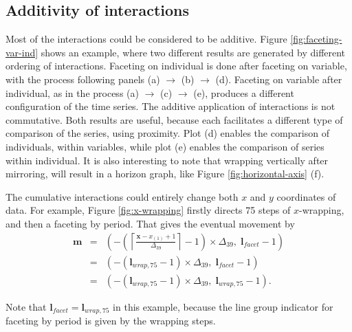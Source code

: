 \documentclass[12pt]{article}
\begin{document}
\subsection{Additivity of interactions\label{interaction-addition}}

Most of the interactions could be considered to be additive.
Figure \ref{fig:faceting-var-ind} shows an example, where two
different results are generated by different ordering of interactions.
Faceting on individual is done after faceting on variable, with the
process following panels (a) $\rightarrow$ (b) $\rightarrow$ (d).
Faceting on variable after individual, as in the process (a)
$\rightarrow$ (c) $\rightarrow$ (e), produces a different
configuration of the time series. The additive application of
interactions is not commutative. Both results are useful, because
each facilitates a different type of comparison of the series,
using proximity. Plot (d) enables the comparison of individuals,
within variables, while plot (e) enables the comparison of series
within individual. It is also interesting to
note that wrapping vertically after mirroring, will result in
a horizon graph, like Figure \ref{fig:horizontal-axis} (f).

The cumulative interactions could
entirely change both $x$ and $y$ coordinates of data.
For example, Figure \ref{fig:x-wrapping} firstly directs
75 steps of $x$-wrapping, and then a faceting by
period. That gives the eventual movement by
\begin{eqnarray*}
\mathbf{m} & = & (-\left(\left\lceil \frac{\mathbf{x}-x_{(1)}+1}{\Delta_{39}}\right\rceil -1\right)\times\Delta_{39}, \; \mathbf{l}{}_{facet}-1) \\
& = & (-(\mathbf{l}{}_{wrap,75} -1)\times\Delta_{39}, \; \mathbf{l}{}_{facet}-1) \\
& = & (-(\mathbf{l}{}_{wrap,75} -1)\times\Delta_{39}, \; \mathbf{l}{}_{wrap,75}-1).
\end{eqnarray*}

Note that $\mathbf{l}{}_{facet} = \mathbf{l}{}_{wrap,75}$
in this example, because the line group indicator for
faceting by period is given by the wrapping steps.
\end{document}

